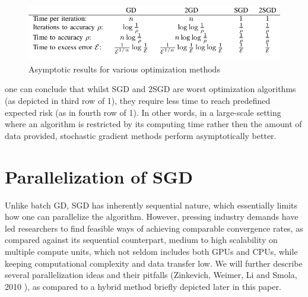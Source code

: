 \begin{figure}[h]
	\begin{center}
		\includegraphics[scale=0.3]{img/gd-convergence.png}
		\caption{Asymptotic results for various optimization methods}\label{1}
	\end{center}
\end{figure}


one can conclude that whilst SGD and 2SGD are worst optimization algorithms (as depicted in third row of \figurename{1}), they require less time to reach predefined expected risk (as in fourth row of \figurename{1}). In other words, in a large-scale setting where an algorithm is restricted by its computing time rather then the amount of data provided, stochastic gradient methods perform asymptotically better.

\section{Parallelization of SGD} 
Unlike batch GD, SGD has inherently sequential nature, which essentially limits how one can parallelize the algorithm. However, pressing industry demands have led researchers to find feasible ways of achieving comparable convergence rates, as compared against its sequential counterpart, medium to high scalability on multiple compute units, which not seldom includes both GPUs and CPUs, while keeping computational complexity and data transfer low. We will further describe several parallelization ideas and their pitfalls (Zinkevich, Weimer, Li and Smola, 2010 \cite{NIPS2010_4006}), as compared to a hybrid method briefly depicted later in this paper.

